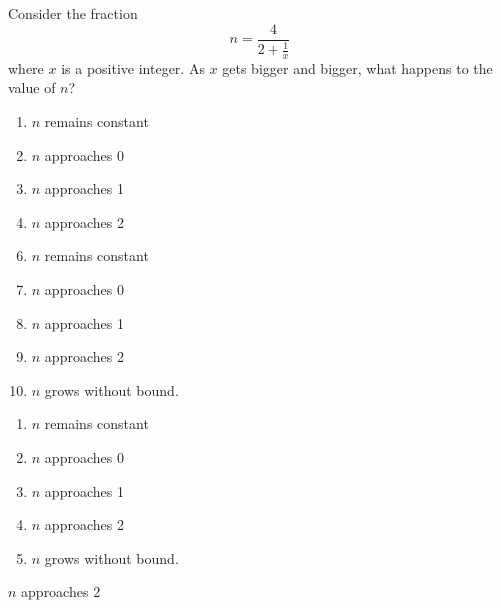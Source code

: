 
   Consider the fraction
\[n=\frac{4}{2+\frac{1}{x}}\] where $x$ is a positive integer.  As $x$ gets bigger and bigger, what happens to the value of $n$?



\ifsat
	\begin{enumerate}[label=\Alph*)]
		\item   $n$ remains constant
		\item  $n$ approaches 0
		\item $n$ approaches 1
		\item $n$ approaches 2%
	\end{enumerate}
\else
\fi

\ifacteven
	\begin{enumerate}[label=\textbf{\Alph*.},itemsep=\fill,align=left]
		\setcounter{enumii}{5}
		\item   $n$ remains constant
		\item  $n$ approaches 0
		\item $n$ approaches 1
		\addtocounter{enumii}{1}
		\item $n$ approaches 2%
		\item $n$ grows without bound.
	\end{enumerate}
\else
\fi

\ifactodd
	\begin{enumerate}[label=\textbf{\Alph*.},itemsep=\fill,align=left]
		\item   $n$ remains constant
		\item  $n$ approaches 0
		\item $n$ approaches 1
		\item $n$ approaches 2%
		\item $n$ grows without bound.
	\end{enumerate}
\else
\fi

\ifgridin
 $n$ approaches 2%

\else
\fi

